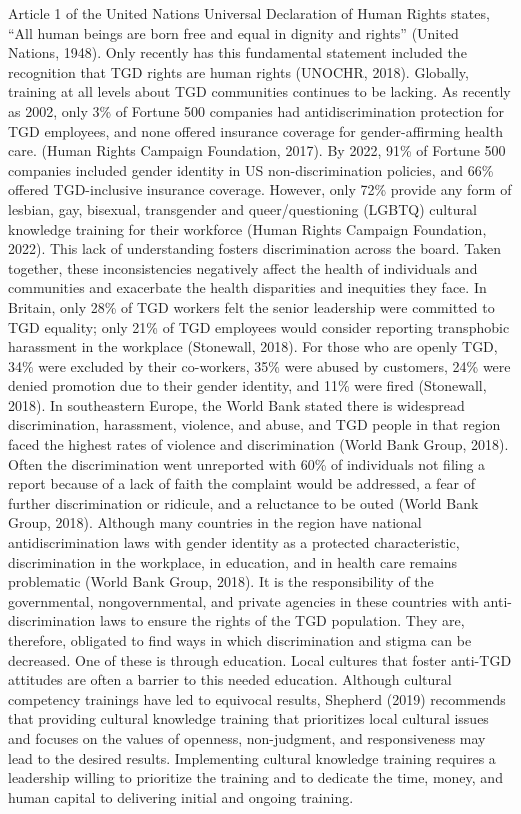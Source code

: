 \documentclass[
]{book}
\begin{document}
Article 1 of the United Nations Universal
Declaration of Human Rights states, ``All human
beings are born free and equal in dignity and
rights'' (United Nations, 1948). Only recently has
this fundamental statement included the recognition that TGD rights are human rights (UNOCHR,
2018). Globally, training at all levels about TGD
communities continues to be lacking. As recently
as 2002, only 3\% of Fortune 500 companies had
antidiscrimination protection for TGD employees,
and none offered insurance coverage for
gender-affirming health care.
(Human Rights
Campaign Foundation, 2017). By 2022, 91\% of
Fortune 500 companies included gender identity
in US non-discrimination policies, and 66\% offered
TGD-inclusive insurance coverage. However, only
72\% provide any form of lesbian, gay, bisexual,
transgender and queer/questioning (LGBTQ) cultural knowledge training for their workforce
(Human Rights Campaign Foundation, 2022). This
lack of understanding fosters discrimination across
the board. Taken together, these inconsistencies
negatively affect the health of individuals and communities and exacerbate the health disparities and
inequities they face. In Britain, only 28\% of TGD
workers felt the senior leadership were committed
to TGD equality; only 21\% of TGD employees
would consider reporting transphobic harassment
in the workplace (Stonewall, 2018). For those who
are openly TGD, 34\% were excluded by their
co-workers, 35\% were abused by customers, 24\%
were denied promotion due to their gender identity, and 11\% were fired (Stonewall, 2018). In
southeastern Europe, the World Bank stated there
is widespread discrimination, harassment, violence,
and abuse, and TGD people in that region faced
the highest rates of violence and discrimination
(World Bank Group, 2018). Often the discrimination went unreported with 60\% of individuals not
filing a report because of a lack of faith the complaint would be addressed, a fear of further discrimination or ridicule, and a reluctance to be
outed (World Bank Group, 2018). Although many
countries in the region have national antidiscrimination laws with gender identity as a protected
characteristic, discrimination in the workplace, in
education, and in health care remains problematic
(World Bank Group, 2018). It is the responsibility
of the governmental, nongovernmental, and private
agencies in these countries with anti-discrimination
laws to ensure the rights of the TGD population.
They are, therefore, obligated to find ways in
which discrimination and stigma can be decreased.
One of these is through education. Local cultures
that foster anti-TGD attitudes are often a barrier
to this needed education. Although cultural competency trainings have led to equivocal results,
Shepherd (2019) recommends that providing cultural knowledge training that prioritizes local cultural issues and focuses on the values of openness,
non-judgment, and responsiveness may lead to the
desired results. Implementing cultural knowledge
training requires a leadership willing to prioritize
the training and to dedicate the time, money, and
human capital to delivering initial and ongoing
training.
\end{document}
